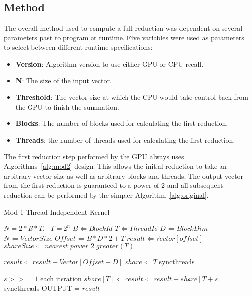 \documentclass[conference]{IEEEtran}
\begin{document}
\subsection{Method}
The overall method used to compute a full reduction was dependent on several parameters past to program at runtime. Five variables were used as parameters to select between different runtime specifications:
\begin{itemize}
  \item \textbf{Version}: Algorithm version to use either GPU or CPU recall.
  \item \textbf{N}: The size of the input vector.
  \item \textbf{Threshold}: The vector size at which the CPU would take control back from the GPU to finish the summation.
  \item \textbf{Blocks}: The number of blocks used for calculating the first reduction.
  \item \textbf{Threads}: the number of threads used for calculating the first reduction.
\end{itemize}
The first reduction step performed by the GPU always uses Algorithms~\ref{alg:mod2} design. This allows the initial reduction to take an arbitrary vector size as well as arbitrary blocks and threads. The output vector from the first reduction is guaranteed to a power of 2 and all subsequent reduction can be performed by the simpler Algorithm~\ref{alg:original}.


\begin{algorithm}
  \caption{Mod 1 Thread Independent Kernel}
  \label{alg:mod1}
  \begin{algorithmic}
    \REQUIRE $N=2*B*T$,~ $T=2^n$
    \STATE $B \Leftarrow BlockId$
    \STATE $T \Leftarrow ThreadId$
    \STATE $D \Leftarrow BlockDim$
    \STATE $N \Leftarrow Vector Size$
    \STATE $Offset \Leftarrow B * D * 2 + T$
    \STATE $result \Leftarrow Vector[offset]$
    \STATE $shareSize \Leftarrow nearest\_power\_2\_greater(T)$
    
        \STATE $result \Leftarrow result + Vector[Offset + D]$
    \ENDIF
    \STATE $share \Leftarrow T$
    \STATE syncthreads
    
    \STATE $s >>= 1$ each iteration
            \STATE $share[T] \Leftarrow result \Leftarrow result + share[T + s]$
        \ENDIF
        \STATE syncthreads
    \ENDFOR
      \STATE OUTPUT = $result$
    \ENDIF
  \end{algorithmic}
\end{algorithm}
\end{document}
